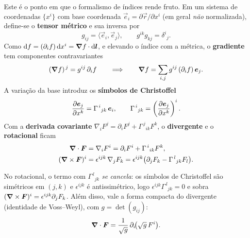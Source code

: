 Este é o ponto em que o formalismo de índices rende fruto. Em um sistema de
coordenadas $\{x^i\}$ com base coordenada $\vec{e}_i=\partial\vec{r}/\partial x^i$
(em geral \emph{não} normalizada), define-se o \textbf{tensor métrico} e sua
inversa por
\begin{equation}
  g_{ij}=\langle\vec{e}_i,\vec{e}_j\rangle,\qquad
  g^{ik}g_{kj}=\delta^{i}{}_{j}.
\end{equation}
Como $\mathrm{d}f=(\partial_i f)\,\mathrm{d}x^i=\bm{\nabla} f\cdot\mathrm{d}\bm{l}$, e
elevando o índice com a métrica, o \textbf{gradiente} tem componentes
contravariantes
\begin{equation}
  (\bm{\nabla} f)^{\,j}=g^{ij}\,\partial_i f
  \qquad\Longrightarrow\qquad
  \bm{\nabla} f=\sum_{i,j} g^{ij}\,(\partial_i f)\,\bm{e}_j .
  \label{eq:gradcurv}
\end{equation}
A variação da base introduz os \textbf{símbolos de Christoffel}
\begin{equation}
  \dfrac{\partial \bm{e}_j}{\partial x^k}=\Gamma^{\,i}{}_{jk}\,\bm{e}_i,
  \qquad
  \Gamma^{\,i}{}_{jk}=\left(\dfrac{\partial \bm{e}_j}{\partial x^k}\right)^{i}.
\end{equation}
Com a \textbf{derivada covariante} $\nabla_i F^{j}=\partial_i F^{j}
+\Gamma^{\,j}{}_{ik}F^{k}$, o \textbf{divergente} e o \textbf{rotacional} ficam
\begin{align}
  \bm{\nabla}\cdot\bm{F}
    &=\nabla_i F^{i}=\partial_i F^{i}+\Gamma^{\,i}{}_{ik}F^{k},
    \label{eq:divcurv}\\
  (\bm{\nabla}\times\bm{F})^{i}
    &=\epsilon^{ijk}\,\nabla_j F_k
     =\epsilon^{ijk}\big(\partial_j F_k-\Gamma^{\,l}{}_{jk}F_l\big).
    \label{eq:rotcurv}
\end{align}
\begin{nota}
No rotacional, o termo com $\Gamma^{\,l}{}_{jk}$ \emph{se cancela}: os símbolos de
Christoffel são simétricos em $(j,k)$ e $\epsilon^{ijk}$ é antissimétrico, logo
$\epsilon^{ijk}\Gamma^{\,l}{}_{jk}=0$ e sobra $(\bm{\nabla}\times\bm{F})^{i}
=\epsilon^{ijk}\partial_j F_k$.
Além disso, vale a forma compacta do divergente (identidade de Voss--Weyl), com
$g=\det(g_{ij})$:
\begin{equation}
  \bm{\nabla}\cdot\bm{F}=\frac{1}{\sqrt{g}}\,\partial_i\!\big(\sqrt{g}\,F^{i}\big).
\end{equation}
\end{nota}

